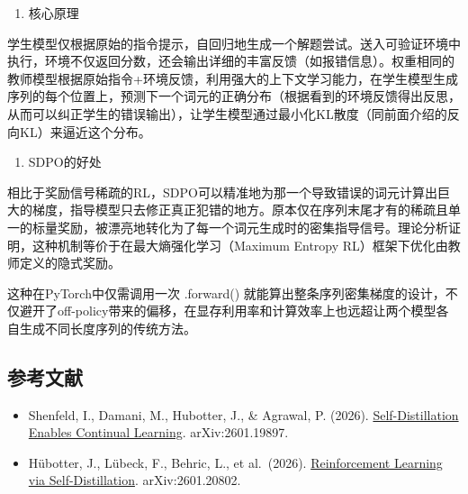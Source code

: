 \begin{enumerate}
\def\labelenumi{\arabic{enumi}.}
\setcounter{enumi}{1}
\tightlist
\item
  核心原理
\end{enumerate}

学生模型仅根据原始的指令提示，自回归地生成一个解题尝试。送入可验证环境中执行，环境不仅返回分数，还会输出详细的丰富反馈（如报错信息）。权重相同的教师模型根据原始指令+环境反馈，利用强大的上下文学习能力，在学生模型生成序列的每个位置上，预测下一个词元的正确分布（根据看到的环境反馈得出反思，从而可以纠正学生的错误输出），让学生模型通过最小化KL散度（同前面介绍的反向KL）来逼近这个分布。

\begin{enumerate}
\def\labelenumi{\arabic{enumi}.}
\setcounter{enumi}{2}
\tightlist
\item
  SDPO的好处
\end{enumerate}

相比于奖励信号稀疏的RL，SDPO可以精准地为那一个导致错误的词元计算出巨大的梯度，指导模型只去修正真正犯错的地方。原本仅在序列末尾才有的稀疏且单一的标量奖励，被漂亮地转化为了每一个词元生成时的密集指导信号。理论分析证明，这种机制等价于在最大熵强化学习（Maximum Entropy RL）框架下优化由教师定义的隐式奖励。

这种在PyTorch中仅需调用一次 .forward() 就能算出整条序列密集梯度的设计，不仅避开了off-policy带来的偏移，在显存利用率和计算效率上也远超让两个模型各自生成不同长度序列的传统方法。

\FloatBarrier
{}
\hypertarget{ux53c2ux8003ux6587ux732e-105}{%
\subsection{参考文献}\label{ux53c2ux8003ux6587ux732e-105}}

\vspace{0.25em}
\begin{itemize}
\tightlist
\item
  Shenfeld, I., Damani, M., Hubotter, J., \& Agrawal, P. (2026). \href{https://arxiv.org/abs/2601.19897}{Self-Distillation Enables Continual Learning}. arXiv:2601.19897.
\item
  Hübotter, J., Lübeck, F., Behric, L., et al.~(2026). \href{https://arxiv.org/abs/2601.20802}{Reinforcement Learning via Self-Distillation}. arXiv:2601.20802.
\end{itemize}

\clearpage
